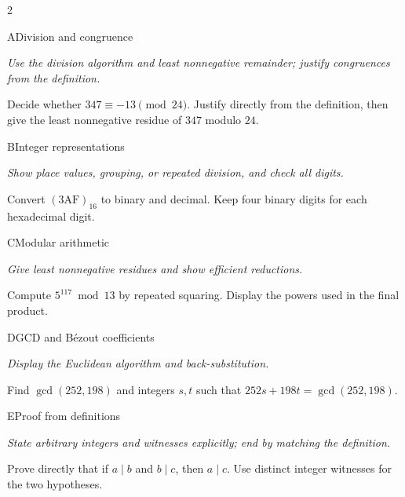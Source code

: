 \documentclass[9pt]{extarticle}
\begin{document}
\begin{multicols}{2}
\begin{CoreProblem}{A}{Division and congruence}
{\scriptsize\textit{Use the division algorithm and least nonnegative remainder; justify congruences from the definition.}\par}
Decide whether $347\equiv-13\pmod{24}$. Justify directly from the definition,
then give the least nonnegative residue of $347$ modulo $24$.
\end{CoreProblem}
\begin{CoreProblem}{B}{Integer representations}
{\scriptsize\textit{Show place values, grouping, or repeated division, and check all digits.}\par}
Convert $(\mathrm{3AF})_{16}$ to binary and decimal. Keep four binary digits
for each hexadecimal digit.
\end{CoreProblem}
\begin{CoreProblem}{C}{Modular arithmetic}
{\scriptsize\textit{Give least nonnegative residues and show efficient reductions.}\par}
Compute $5^{117}\bmod13$ by repeated squaring. Display the powers used in the
final product.
\end{CoreProblem}
\columnbreak
\begin{CoreProblem}{D}{GCD and B\'ezout coefficients}
{\scriptsize\textit{Display the Euclidean algorithm and back-substitution.}\par}
Find $\gcd(252,198)$ and integers $s,t$ such that
$252s+198t=\gcd(252,198)$.
\end{CoreProblem}
\begin{CoreProblem}{E}{Proof from definitions}
{\scriptsize\textit{State arbitrary integers and witnesses explicitly; end by matching the definition.}\par}
Prove directly that if $a\mid b$ and $b\mid c$, then $a\mid c$. Use distinct
integer witnesses for the two hypotheses.
\end{CoreProblem}
\end{multicols}
\CoreWorkArea
\FormBreak
{}
\end{document}
